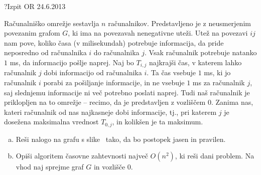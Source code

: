 \begin{naloga}{?}{Izpit OR 24.6.2013}
\begin{vprasanje}
Računalniško omrežje sestavlja $n$ računalnikov.
Predstavljeno je z neusmerjenim povezanim grafom $G$,
ki ima na povezavah nenegativne uteži.
Utež na povezavi $ij$ nam pove,
koliko časa (v milisekundah) potrebuje informacija,
da pride neposredno od računalnika $i$ do računalnika $j$.
Vsak računalnik potrebuje natanko $1$ ms, da informacijo pošlje naprej.
Naj bo $T_{i,j}$ najkrajši čas,
v katerem lahko računalnik $j$ dobi informacijo od računalnika $i$.
Ta čas vsebuje $1$ ms, ki jo računalnik $i$ porabi za pošiljanje informacije,
in ne vsebuje $1$ ms za računalnik $j$,
saj slednjemu informacije ni več potrebno poslati naprej.
Tudi naš računalnik je priklopljen na to omrežje
-- recimo, da je predstavljen z vozliščem 0.
Zanima nas, kateri računalnik od nas najkasneje dobi informacije,
tj., pri katerem $j$ je dosežena maksimalna vrednost $T_{0,j}$,
in kolikšen je ta maksimum.

\begin{enumerate}[(a)]
\item Reši nalogo na grafu s slike~\fig{} tako,
da bo postopek jasen in pravilen.

\item Opiši algoritem časovne zahtevnosti največ $O(n^2)$,
ki reši dani problem.
Na vhod naj sprejme graf $G$ in vozlišče $0$.
\end{enumerate}

\begin{slika}
\pgfslika
{}
\end{slika}
\end{vprasanje}
\begin{odgovor}
\end{odgovor}
\end{naloga}
